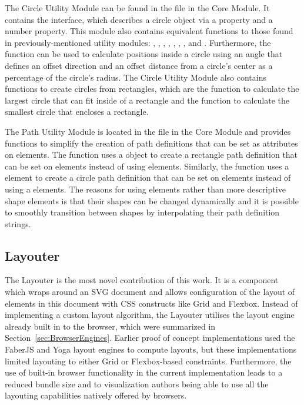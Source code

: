 The Circle Utility Module can be found in the
 file in the Core Module.  It contains the
 interface, which describes a circle object via a
  property and a  number
property.  This module also contains equivalent functions to those
found in previously-mentioned utility modules: ,
, , ,
, , ,
and .  Furthermore, the 
function can be used to calculate positions inside a circle using an
angle that defines an offset direction and an offset distance from a
circle's center as a percentage of the circle's radius.  The Circle
Utility Module also contains functions to create circles from
rectangles, which are the  function to
calculate the largest circle that can fit inside of a rectangle and
the  function to calculate the smallest circle
that encloses a rectangle.

The Path Utility Module is located in the 
file in the Core Module and provides functions to simplify the
creation of path definitions that can be set as  attributes on
 elements.  The  function uses a
 object to create a rectangle path definition that can be
set on  elements instead of using  elements.
Similarly, the  function uses a  element
to create a circle path definition that can be set on 
elements instead of using a  elements. The reasons for
using  elements rather than more descriptive shape
elements is that their shapes can be changed dynamically and it
is possible to smoothly transition between shapes by interpolating
their path definition strings.



\subsection{Layouter}
\label{sec:Layouter}

The Layouter is the most novel contribution of this work.  It is a
component which wraps around an SVG document and allows configuration
of the layout of elements in this document with CSS constructs like
Grid and Flexbox. Instead of implementing a custom layout algorithm,
the Layouter utilises the layout engine already built in to the
browser, which were summarized in Section~\ref{sec:BrowserEngines}.
Earlier proof of concept implementations used the FaberJS
\parencite{FaberJS} and Yoga \parencite{Yoga} layout engines to
compute layouts, but these implementations limited layouting to either
Grid or Flexbox-based constraints. Furthermore, the use of built-in
browser functionality in the current implementation leads to a reduced
bundle size and to visualization authors being able to use all the
layouting capabilities natively offered by browsers.

